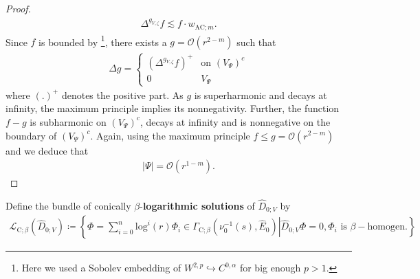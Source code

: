 \documentclass[psamsfonts]{amsart}
\theoremstyle{plain}
\theoremstyle{definition}{
\newtheorem{defi}{Definition}[section]
\newtheorem{ass}{Assumption}
\newtheorem*{nota}{Notation}}
\theoremstyle{remark}{
\newtheorem{rem}{Remark}
\newtheorem{ex}{Example}}
\theoremstyle{plain}{
\newtheorem{thm}{Theorem}[section]
\newtheorem{lem}{Lemma}[section]
\newtheorem{cor}{Corollary}[section]
\newtheorem{prop}{Proposition}[section]
\newtheorem{con}{Conjecture}[section]}
\newcommand{\m}[1]{{\mathrm{#1}}}
\begin{document}
\begin{proof}
\begin{align*}
    \Delta^{g_{V,\zeta}}f\lesssim f\cdot w_{\m{AC};m}.
\end{align*}
Since $f$ is bounded by \cite[Theorem 8.3.6(a)]{joyce2000compact}\footnote{Here we used a Sobolev embedding of $W^{2,p}\hookrightarrow C^{0,\alpha}$ for big enough $p>1$.}, there exists a $g=\mathcal{O}(r^{2-m})$ such that 
\begin{align*}
    \Delta g=\left\{\begin{array}{ll}
         (\Delta^{g_{V,\zeta}} f)^+& \text{on } (V_\Psi)^c\\
         0& V_\Psi
    \end{array}\right.
\end{align*}
where $(.)^+$ denotes the positive part. As $g$ is superharmonic and decays at infinity, the maximum principle implies its nonnegativity. Further, the function $f-g$ is subharmonic on $(V_\Psi)^c$, decays at infinity and is nonnegative on the boundary of $(V_\Psi)^c$. Again, using the maximum principle $f\leq g=\mathcal{O}(r^{2-m})$ and we deduce that
\begin{align*}
    |\Psi|=\mathcal{O}(r^{1-m}).
\end{align*}
\end{proof}



\begin{defi}
    Define the bundle of conically $\beta$-\textbf{logarithmic solutions} of $\widehat{D}_{0;V}$ by
\begin{align*}
        \mathcal{L}_{\m{C};\beta}(\widehat{D}_{0;V})\coloneqq\left\{\Phi=\left.\sum^n_{i=0}\m{log}^i(r)\Phi_i\in \Gamma_{\m{C};\beta}(\nu_0^{-1}(s),\widehat{E}_0)\right|\widehat{D}_{0;V}\Phi=0,\Phi_i\text{ is }\beta-\text{homogen.}\right\}
    \end{align*}
\end{defi}
\end{document}
